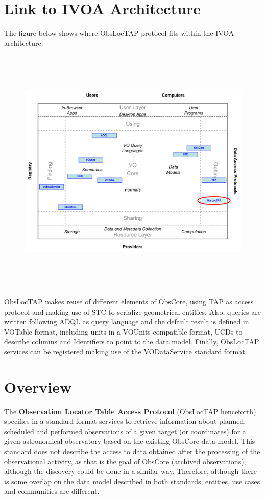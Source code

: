 \documentclass[11pt,a4paper]{ivoa}
\begin{document}
\section*{Link to IVOA Architecture}
The figure below shows where ObsLocTAP protocol fits within the IVOA architecture:


\begin{figure}[H]
\advance\leftskip 0.0in	\includegraphics[width=5.0in,height=4.73in]{./role_diagram.pdf}
\end{figure}


ObsLocTAP makes reuse of different elements of ObsCore, using TAP as access protocol and making use of STC to serialize geometrical entities. Also, queries are written
following ADQL as query language and the default result is defined in VOTable format, including units in a VOUnits compatible format, UCDs to describe columns and Identifiers to point to the data model. Finally, ObsLocTAP services can be registered making use of the VODataService standard format.

\pagebreak


\section{Overview}
The \textbf{Observation Locator Table Access Protocol} (ObsLocTAP henceforth) specifies 
in a standard format services to retrieve information about planned, scheduled and 
performed observations of a given target (or coordinates) for a given astronomical 
observatory based 
on the existing ObsCore data model. This standard does not describe the access to data 
obtained after the processing of the observational activity, as that is the goal of 
ObsCore (archived observations), although the discovery could be done in a similar way. 
Therefore, although there is some overlap on the data model described in both standards, 
entities, use cases and communities are different.
\end{document}
